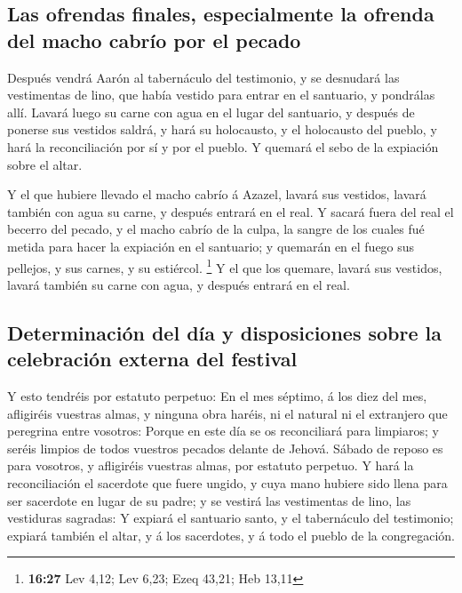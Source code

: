 \hypertarget{las-ofrendas-finales-especialmente-la-ofrenda-del-macho-cabruxedo-por-el-pecado}{%
\subsection{Las ofrendas finales, especialmente la ofrenda del macho
cabrío por el
pecado}\label{las-ofrendas-finales-especialmente-la-ofrenda-del-macho-cabruxedo-por-el-pecado}}

 Después vendrá Aarón al tabernáculo del testimonio, y se
desnudará las vestimentas de lino, que había vestido para entrar en el
santuario, y pondrálas allí.  Lavará luego su carne con
agua en el lugar del santuario, y después de ponerse sus vestidos
saldrá, y hará su holocausto, y el holocausto del pueblo, y hará la
reconciliación por sí y por el pueblo.  Y quemará el sebo
de la expiación sobre el altar.

 Y el que hubiere llevado el macho cabrío á Azazel,
lavará sus vestidos, lavará también con agua su carne, y después entrará
en el real.  Y sacará fuera del real el becerro del
pecado, y el macho cabrío de la culpa, la sangre de los cuales fué
metida para hacer la expiación en el santuario; y quemarán en el fuego
sus pellejos, y sus carnes, y su estiércol. \footnote{\textbf{16:27} Lev
  4,12; Lev 6,23; Ezeq 43,21; Heb 13,11}  Y el que los
quemare, lavará sus vestidos, lavará también su carne con agua, y
después entrará en el real.

\hypertarget{determinaciuxf3n-del-duxeda-y-disposiciones-sobre-la-celebraciuxf3n-externa-del-festival}{%
\subsection{Determinación del día y disposiciones sobre la celebración
externa del
festival}\label{determinaciuxf3n-del-duxeda-y-disposiciones-sobre-la-celebraciuxf3n-externa-del-festival}}

 Y esto tendréis por estatuto perpetuo: En el mes
séptimo, á los diez del mes, afligiréis vuestras almas, y ninguna obra
haréis, ni el natural ni el extranjero que peregrina entre vosotros:
 Porque en este día se os reconciliará para limpiaros; y
seréis limpios de todos vuestros pecados delante de Jehová.
 Sábado de reposo es para vosotros, y afligiréis vuestras
almas, por estatuto perpetuo.  Y hará la reconciliación
el sacerdote que fuere ungido, y cuya mano hubiere sido llena para ser
sacerdote en lugar de su padre; y se vestirá las vestimentas de lino,
las vestiduras sagradas:  Y expiará el santuario santo, y
el tabernáculo del testimonio; expiará también el altar, y á los
sacerdotes, y á todo el pueblo de la congregación.

